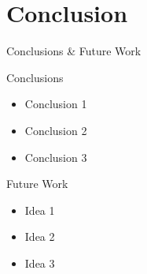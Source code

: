 \setlength{\parskip}{\baselineskip}
\section{Conclusion}

\begin{frame}
	\huge Conclusions \& Future Work
\end{frame}

\begin{frame}{Conclusions}
	\begin{itemize}
		\item Conclusion 1
		\item Conclusion 2
		\item Conclusion 3
	\end{itemize}
\end{frame}

\begin{frame}{Future Work}
	\begin{itemize}
		\item Idea 1
		\item Idea 2
		\item Idea 3
	\end{itemize}
\end{frame}
